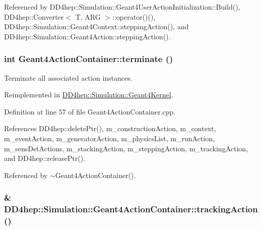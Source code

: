 Referenced by DD4hep::Simulation::Geant4UserActionInitialization::Build(), DD4hep::Converter$<$ T, ARG $>$::operator()(), DD4hep::Simulation::Geant4Context::steppingAction(), and DD4hep::Simulation::Geant4Action::steppingAction().\hypertarget{class_d_d4hep_1_1_simulation_1_1_geant4_action_container_ad9cfc3e1bc35d384f5dbd4e8747ddf69}{
\subsubsection[{terminate}]{\setlength{\rightskip}{0pt plus 5cm}int Geant4ActionContainer::terminate ()}}
\label{class_d_d4hep_1_1_simulation_1_1_geant4_action_container_ad9cfc3e1bc35d384f5dbd4e8747ddf69}


Terminate all associated action instances. 

Reimplemented in \hyperlink{class_d_d4hep_1_1_simulation_1_1_geant4_kernel_ae73e828fed81e3343fe49f08701d3ac3}{DD4hep::Simulation::Geant4Kernel}.

Definition at line 57 of file Geant4ActionContainer.cpp.

References DD4hep::deletePtr(), m\_\-constructionAction, m\_\-context, m\_\-eventAction, m\_\-generatorAction, m\_\-physicsList, m\_\-runAction, m\_\-sensDetActions, m\_\-stackingAction, m\_\-steppingAction, m\_\-trackingAction, and DD4hep::releasePtr().

Referenced by $\sim$Geant4ActionContainer().\hypertarget{class_d_d4hep_1_1_simulation_1_1_geant4_action_container_a39580aa5a9e07279b16b2739efba2608}{
\subsubsection[{trackingAction}]{\& DD4hep::Simulation::Geant4ActionContainer::trackingAction ()}}
\label{class_d_d4hep_1_1_simulation_1_1_geant4_action_container_a39580aa5a9e07279b16b2739efba2608}


